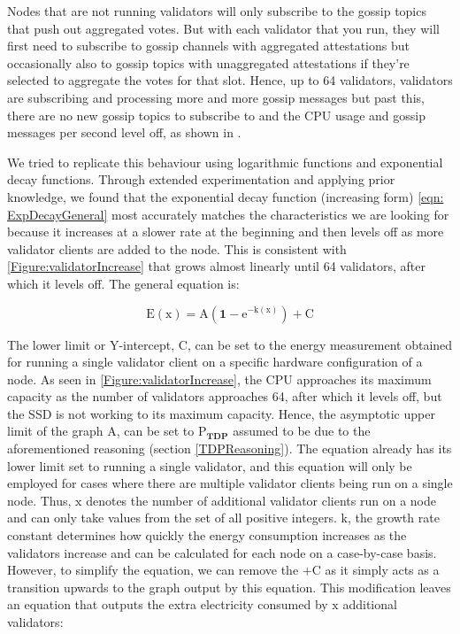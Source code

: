 Nodes that are not running validators will only subscribe to the gossip topics that push out aggregated votes. But with each validator that you run, they will first need to subscribe to gossip channels with aggregated attestations but occasionally also to gossip topics with unaggregated attestations if they're selected to aggregate the votes for that slot. Hence, up to 64 validators, validators are subscribing and processing more and more gossip messages but past this, there are no new gossip topics to subscribe to and the CPU usage and gossip messages per second level off, as shown in .

We tried to replicate this behaviour using logarithmic functions and exponential decay functions. Through extended experimentation and applying prior knowledge, we found that the exponential decay function (increasing form) \ref{eqn: ExpDecayGeneral} most accurately matches the characteristics we are looking for because it increases at a slower rate at the beginning and then levels off as more validator clients are added to the node. This is consistent with \ref{Figure:validatorIncrease} that grows almost linearly until 64 validators, after which it levels off. The general equation is:

\begin{equation}
    \label{eqn: ExpDecayGeneral}
    \boldsymbol{\mathrm{E(\mathrm{x})} = \mathrm{A} (1-\mathrm{e}^{-\mathrm{k}(\mathrm{x})}) + \mathrm{C}}
\end{equation}

The lower limit or Y-intercept, $\boldsymbol{\mathrm{C}}$, can be set to the energy measurement obtained for running a single validator client on a specific hardware configuration of a node. As seen in \ref{Figure:validatorIncrease}, the CPU approaches its maximum capacity as the number of validators approaches 64, after which it levels off, but the SSD is not working to its maximum capacity. Hence, the asymptotic upper limit of the graph $\boldsymbol{\mathrm{A}}$, can be set to $\boldsymbol{\mathrm{P}_{TDP}}$ assumed to be due to the aforementioned reasoning (section \ref{TDPReasoning}). The equation already has its lower limit set to running a single validator, and this equation will only be employed for cases where there are multiple validator clients being run on a single node. Thus, $\boldsymbol{\mathrm{x}}$ denotes the number of additional validator clients run on a node and can only take values from the set of all positive integers.  $\boldsymbol{\mathrm{k}}$, the growth rate constant determines how quickly the energy consumption increases as the validators increase and can be calculated for each node on a case-by-case basis. However, to simplify the equation, we can remove the $\boldsymbol{ + \mathrm{C}}$ as it simply acts as a transition upwards to the graph output by this equation. This modification leaves an equation that outputs the extra electricity consumed by $\boldsymbol{\mathrm{x}}$ additional validators:

